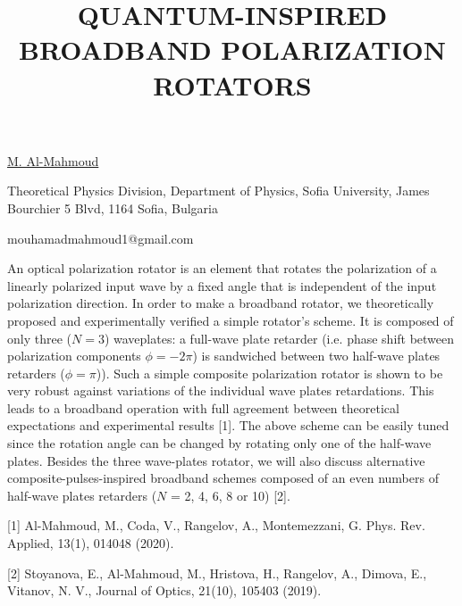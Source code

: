 \title{QUANTUM-INSPIRED BROADBAND POLARIZATION ROTATORS}

\underline{M. Al-Mahmoud} 

{\normalsize{\vspace{-4mm}
Theoretical Physics Division, Department of Physics, Sofia University,
James Bourchier 5 Blvd, 1164 Sofia, Bulgaria



\email mouhamadmahmoud1@gmail.com}}

An optical polarization rotator is an element that rotates the polarization of a linearly polarized input wave by a fixed angle that is independent of the input polarization direction. In order to make a broadband rotator, we theoretically proposed and experimentally verified a simple rotator’s scheme. It is composed of only three ($N=3$) waveplates: a full-wave plate retarder (i.e. phase shift between polarization components $\phi=-2\pi$) is sandwiched between two half-wave plates retarders ($\phi=\pi$)). Such a simple composite polarization rotator is shown to be very robust against variations of the individual wave plates retardations. This leads to a broadband operation with full agreement between theoretical expectations and experimental results [1]. The above scheme can be easily tuned since the rotation angle can be changed by rotating only one of the half-wave plates. Besides the three wave-plates rotator, we will also discuss alternative composite-pulses-inspired broadband schemes composed of an even numbers of half-wave plates retarders ($N$ = 2, 4, 6, 8 or 10) [2].

{\normalsize
[1] Al-Mahmoud, M., Coda, V., Rangelov, A., Montemezzani, G. Phys. Rev. Applied, 13(1), 014048 (2020).
\vsp

[2] Stoyanova, E., Al-Mahmoud, M., Hristova, H., Rangelov, A., Dimova, E., Vitanov, N. V., Journal of Optics, 21(10), 105403 (2019).
}

\vspace{\baselineskip}
